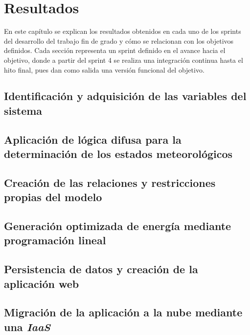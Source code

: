 \chapter{Resultados}
\label{cap:Resultados}
En este capítulo se explican los resultados obtenidos en cada uno de los sprints del desarrollo del trabajo fin de grado y cómo se relacionan con los objetivos definidos. Cada sección representa un sprint definido en el avance hacia el objetivo, donde a partir del sprint 4 se realiza una integración continua hasta el hito final, pues dan como salida una versión funcional del objetivo.

\section{Identificación y adquisición de las variables del sistema}

\section{Aplicación de lógica difusa para la determinación de los estados meteorológicos}

\section{Creación de las relaciones y restricciones propias del modelo}

\section{Generación optimizada de energía mediante programación lineal}

\section{Persistencia de datos y creación de la aplicación web}

\section{Migración de la aplicación a la nube mediante una \textit{IaaS}}
